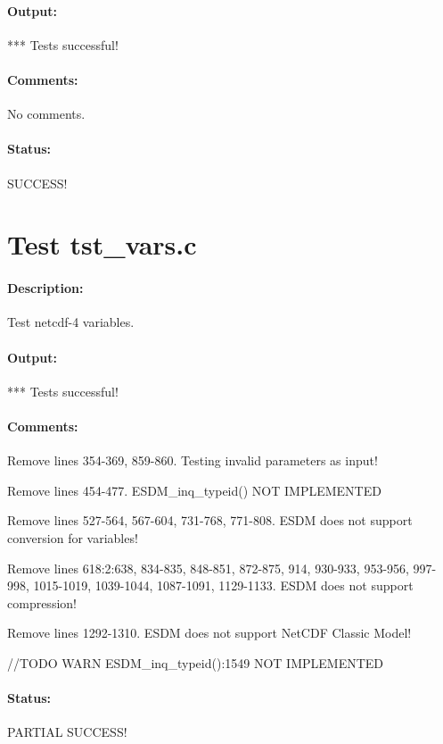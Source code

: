 \paragraph{Output:} *** Tests successful!

\paragraph{Comments:} No comments.

\paragraph{Status:} SUCCESS!

\section{Test tst\_vars.c}

\paragraph{Description:} Test netcdf-4 variables.

\paragraph{Output:} *** Tests successful!

\paragraph{Comments:} Remove lines 354-369, 859-860. Testing invalid parameters as input!

Remove lines 454-477. ESDM\_inq\_typeid() NOT IMPLEMENTED

Remove lines 527-564, 567-604, 731-768, 771-808. ESDM does not support conversion for variables!

Remove lines 618:2:638, 834-835, 848-851, 872-875, 914, 930-933, 953-956, 997-998, 1015-1019, 1039-1044, 1087-1091, 1129-1133. ESDM does not support compression!

Remove lines 1292-1310. ESDM does not support NetCDF Classic Model!

//TODO WARN ESDM\_inq\_typeid():1549 NOT IMPLEMENTED

\paragraph{Status:} PARTIAL SUCCESS!


